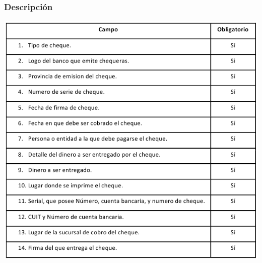 \subsubsection{Descripción}
\begin{center}
 \includegraphics[scale=0.9,keepaspectratio=true]{./Circuitos-Teoricos/Pago-a-Proveedores/Images/descripcion-cheque.png}
\end{center}

\pagebreak
